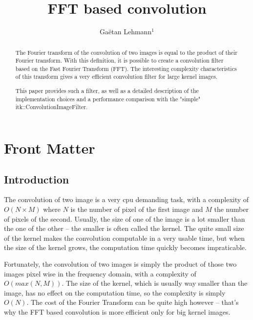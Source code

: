 \documentclass{InsightArticle}
\title{FFT based convolution}
\author{Ga\"etan Lehmann{$^1$}}
\newcommand{\IJhandlerIDnumber}{3154}
\begin{document}
%
% 
\IJhandlefooter{\IJhandlerIDnumber}

\maketitle

\ifhtml
\chapter*{Front Matter\label{front}}
\fi


\begin{abstract}
\noindent

The Fourier transform of the convolution of two images is equal to the product of their
Fourier transform. With this definition, it is possible to create a convolution filter
based on the Fast Fourier Transform (FFT). The interesting complexity characteristics of
this transform gives a very efficient convolution filter for large kernel images.

This paper provides such a filter, as well as a detailed description of the implementation
choices and a performance comparison with the "simple" itk::ConvolutionImageFilter.

\end{abstract}

\IJhandlenote{\IJhandlerIDnumber}

\tableofcontents

\section{Introduction}

The convolution of two image is a very cpu demanding task, with a complexity of $O(N \times M)$ where $N$ is
the number of pixel of the first image and $M$ the number of pixels of the second. Usually, the size
of one of the image is a lot smaller than the one of the other -- the smaller is often called the
kernel. The quite small size of the kernel makes the convolution computable in a very usable time,
but when the size of the kernel grows, the computation time quickly becomes impraticable.

Fortunately, the convolution of two images is simply the product of those two images pixel wise in
the frequency domain, with a complexity of $O(max(N, M))$. The size of the kernel, which is usually
way smaller than the image, has no effect on the computation time, so the complexity is simply $O(N)$.
The cost of the Fourier Transform
can be quite high however -- that's why the FFT based convolution is more efficient only for big
kernel images.
\end{document}
